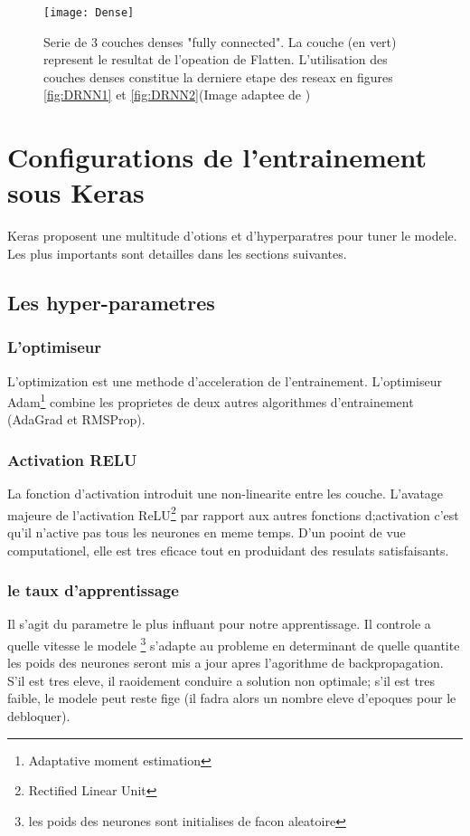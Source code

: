 \begin{figure}[!h] 
\centering
\texttt{[image: Dense]} 
\decoRule
\caption[Dense]{Serie de 3 couches denses "fully connected". La couche (en vert) represent le resultat de l'opeation de Flatten. L'utilisation des couches denses constitue la derniere etape des reseax en figures \ref{fig:DRNN1} et \ref{fig:DRNN2}(Image adaptee de \parencite{Reference9})}
\label{fig:Dense}
\end{figure}


\section{Configurations de l'entrainement sous Keras}
Keras proposent une multitude d'otions et d'hyperparatres pour tuner le modele. Les plus importants sont detailles dans les sections suivantes.

\subsection{Les hyper-parametres}

\subsubsection{L'optimiseur}
L'optimization est une methode d'acceleration de l'entrainement. L'optimiseur Adam\footnote{Adaptative moment estimation} combine les proprietes de deux autres algorithmes d'entrainement (AdaGrad et RMSProp).

\subsubsection{Activation RELU}
La fonction d'activation introduit une non-linearite entre les couche. L'avatage majeure de l'activation ReLU\footnote{Rectified Linear Unit} par rapport aux autres fonctions d;activation c'est qu'il n'active pas tous les neurones en meme temps. D'un pooint de vue computationel, elle est tres eficace tout en produidant des resulats satisfaisants.

\subsubsection{le taux d'apprentissage}
Il s'agit du parametre le plus influant pour notre apprentissage. Il controle a quelle vitesse le modele \footnote{les poids des neurones sont initialises de facon aleatoire} s'adapte au probleme en determinant de quelle quantite les poids des neurones seront mis a jour apres l'agorithme de backpropagation. S'il est tres eleve, il raoidement conduire a solution non optimale; s'il est tres faible, le modele peut reste fige (il fadra alors un nombre eleve d'epoques pour le debloquer).

